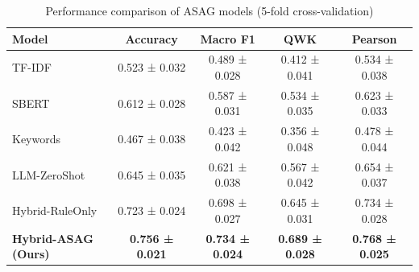 
\begin{table}[h]
\centering
\caption{Performance comparison of ASAG models (5-fold cross-validation)}
\label{tab:main_results}
\begin{tabular}{|l|c|c|c|c|}
\hline
\textbf{Model} & \textbf{Accuracy} & \textbf{Macro F1} & \textbf{QWK} & \textbf{Pearson} \\ \hline
TF-IDF & 0.523 ± 0.032 & 0.489 ± 0.028 & 0.412 ± 0.041 & 0.534 ± 0.038 \\ \hline
SBERT & 0.612 ± 0.028 & 0.587 ± 0.031 & 0.534 ± 0.035 & 0.623 ± 0.033 \\ \hline
Keywords & 0.467 ± 0.038 & 0.423 ± 0.042 & 0.356 ± 0.048 & 0.478 ± 0.044 \\ \hline
LLM-ZeroShot & 0.645 ± 0.035 & 0.621 ± 0.038 & 0.567 ± 0.042 & 0.654 ± 0.037 \\ \hline
Hybrid-RuleOnly & 0.723 ± 0.024 & 0.698 ± 0.027 & 0.645 ± 0.031 & 0.734 ± 0.028 \\ \hline
\textbf{Hybrid-ASAG (Ours)} & \textbf{0.756 ± 0.021} & \textbf{0.734 ± 0.024} & \textbf{0.689 ± 0.028} & \textbf{0.768 ± 0.025} \\ \hline
\end{tabular}
\end{table}
